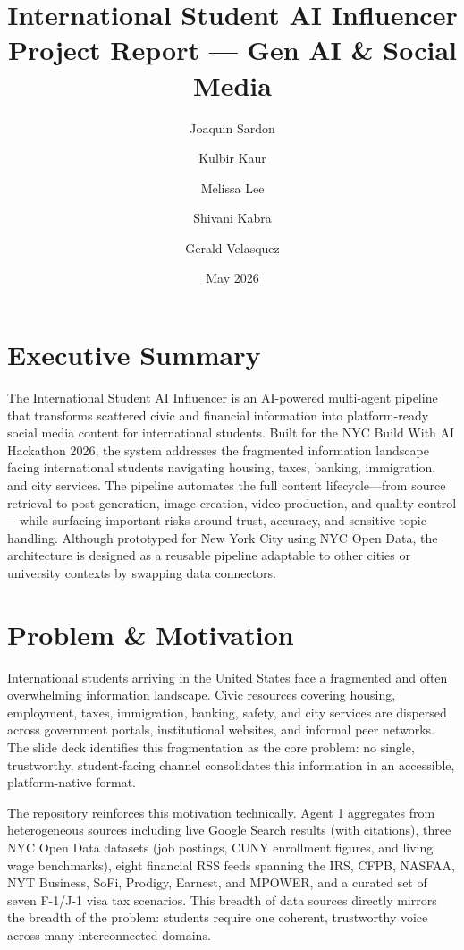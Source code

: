 \documentclass[12pt, letterpaper]{article}
\title{\textbf{International Student AI Influencer}\\[0.4em]
\large Project Report --- Gen AI \& Social Media}
\author{
  Joaquin Sardon \and
  Kulbir Kaur \and
  Melissa Lee \and
  Shivani Kabra \and
  Gerald Velasquez
}
\date{May 2026}
\begin{document}
\maketitle
\thispagestyle{empty}
\newpage

\section{Executive Summary}

The International Student AI Influencer is an AI-powered multi-agent pipeline that
transforms scattered civic and financial information into platform-ready social media
content for international students. Built for the NYC Build With AI Hackathon 2026,
the system addresses the fragmented information landscape facing international students
navigating housing, taxes, banking, immigration, and city services. The pipeline
automates the full content lifecycle---from source retrieval to post generation, image
creation, video production, and quality control---while surfacing important risks around
trust, accuracy, and sensitive topic handling. Although prototyped for New York City
using NYC Open Data, the architecture is designed as a reusable pipeline adaptable to
other cities or university contexts by swapping data connectors.

\section{Problem \& Motivation}

International students arriving in the United States face a fragmented and often
overwhelming information landscape. Civic resources covering housing, employment, taxes,
immigration, banking, safety, and city services are dispersed across government portals,
institutional websites, and informal peer networks. The slide deck identifies this
fragmentation as the core problem: no single, trustworthy, student-facing channel
consolidates this information in an accessible, platform-native format.

The repository reinforces this motivation technically. Agent 1 aggregates from
heterogeneous sources including live Google Search results (with citations), three NYC
Open Data datasets (job postings, CUNY enrollment figures, and living wage benchmarks),
eight financial RSS feeds spanning the IRS, CFPB, NASFAA, NYT Business, SoFi, Prodigy,
Earnest, and MPOWER, and a curated set of seven F-1/J-1 visa tax scenarios. This breadth
of data sources directly mirrors the breadth of the problem: students require one
coherent, trustworthy voice across many interconnected domains.
\end{document}
